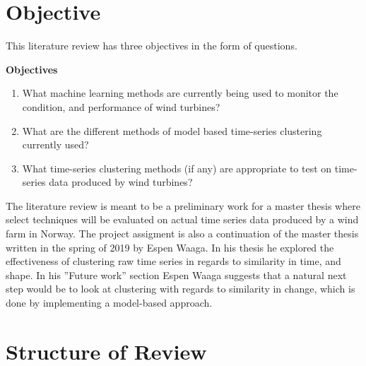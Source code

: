 \section{Objective} \label{sec:objective}
This literature review has three objectives in the form of questions. \bigskip

\begin{tcolorbox}
    \textbf{Objectives}

    \begin{enumerate}
        \item What machine learning methods are currently being used to monitor the condition, and performance of wind turbines?
        \item What are the different methods of model based time-series clustering currently used?
        \item What time-series clustering methods (if any) are appropriate to test on time-series data produced by wind turbines? 
    \end{enumerate}
\end{tcolorbox}
\bigskip

The literature review is meant to be a preliminary work for a master thesis where select techniques will be evaluated on actual time series data produced by a wind farm in Norway. The project assigment is also a continuation of the master thesis written in the spring of 2019 by Espen Waaga. In his thesis he explored the effectiveness of clustering raw time series in regards to similarity in time, and shape. In his ''Future work'' section Espen Waaga suggests that a natural next step would be to look at clustering with regards to similarity in change, which is done by implementing a model-based approach.

\section{Structure of Review}
